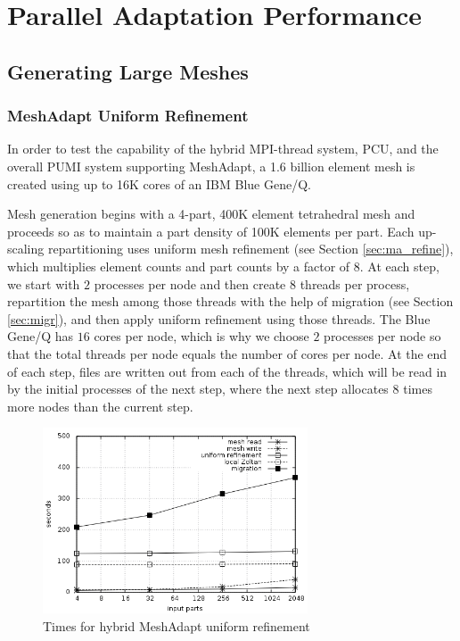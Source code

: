 \section{Parallel Adaptation Performance}

\subsection{Generating Large Meshes}
\label{sec:big_gen}

\subsubsection{MeshAdapt Uniform Refinement}
\label{sec:ma_scale}

In order to test the capability of the hybrid MPI-thread system, PCU,
and the overall PUMI system supporting MeshAdapt,
a 1.6 billion element mesh is created using up to 16K cores of an
IBM Blue Gene/Q.

Mesh generation begins with a 4-part, 400K element tetrahedral
mesh and proceeds so as to maintain a part density of 100K elements
per part.
Each up-scaling repartitioning uses uniform mesh refinement
(see Section \ref{sec:ma_refine}), which
multiplies element counts and part counts by a factor of $8$.
At each step, we start with $2$ processes per node
and then create $8$ threads per process, repartition the mesh
among those threads with the help of migration (see Section \ref{sec:migr}),
and then apply uniform refinement using those threads.
The Blue Gene/Q has $16$ cores per node, which is why we choose $2$
processes per node so that the total threads per node equals the
number of cores per node.
At the end of each step, files are written out from each of the
threads, which will be read in by the initial processes of the
next step, where the next step allocates $8$ times more nodes
than the current step.

\begin{figure}[!ht]
\begin{center}
\caption{Times for hybrid MeshAdapt uniform refinement}
\label{fig:pcu_scale}
\includegraphics[width=0.7\textwidth]{pcu_scaling.png}
\end{center}
\end{figure}

